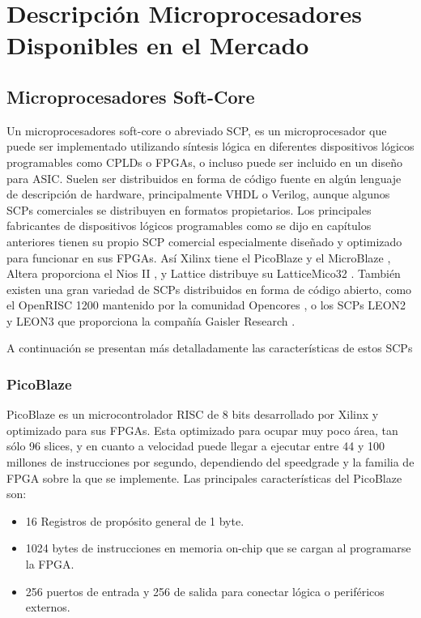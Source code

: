 
\chapter{Descripción Microprocesadores Disponibles en el Mercado}
	\section{Microprocesadores Soft-Core}
	Un microprocesadores soft-core o abreviado SCP, es un microprocesador que puede ser implementado utilizando síntesis lógica en diferentes dispositivos lógicos programables como CPLDs o FPGAs, o incluso puede ser incluido en un diseño para ASIC.
 	Suelen ser distribuidos en forma de código fuente en algún lenguaje de descripción de hardware, principalmente VHDL o Verilog, aunque  algunos SCPs
 	comerciales se distribuyen en formatos propietarios.
	Los principales fabricantes de dispositivos lógicos programables como se dijo en capítulos anteriores tienen su propio  SCP comercial especialmente
	diseñado y optimizado para funcionar en sus FPGAs. Así Xilinx tiene el PicoBlaze \cite{Etiqueta15} y el MicroBlaze \cite{Etiqueta16}, Altera
	proporciona el Nios II \cite{Etiqueta17}, y Lattice distribuye su LatticeMico32 \cite{Etiqueta18}. También existen una gran variedad de SCPs
	distribuidos en forma de código abierto, como el OpenRISC 1200 \cite{Etiqueta19} mantenido por la comunidad Opencores \cite{Etiqueta20}, o los  SCPs
	LEON2 y LEON3 \cite{Etiqueta21} \cite{Etiqueta22} que proporciona la compañía Gaisler Research \cite{Etiqueta23}.
		
	A continuación se presentan más detalladamente las características de estos SCPs%
	\subsection{PicoBlaze}
	
	PicoBlaze es un microcontrolador RISC de 8 bits desarrollado por Xilinx y optimizado para sus FPGAs. Esta optimizado para ocupar muy poco área, tan sólo 96 slices, y en cuanto a velocidad puede llegar a ejecutar entre 44 y 100 millones de instrucciones por segundo, dependiendo del speedgrade y la familia de FPGA sobre la que se implemente. Las principales características del PicoBlaze son:
	
  
	\begin{itemize}
	  \item  16 Registros de propósito general de 1 byte.
	  \item 1024 bytes de instrucciones en memoria on-chip que se cargan al programarse la FPGA.
	  \item 256 puertos de entrada y 256 de salida para conectar lógica o periféricos externos.
	\end{itemize}
	

